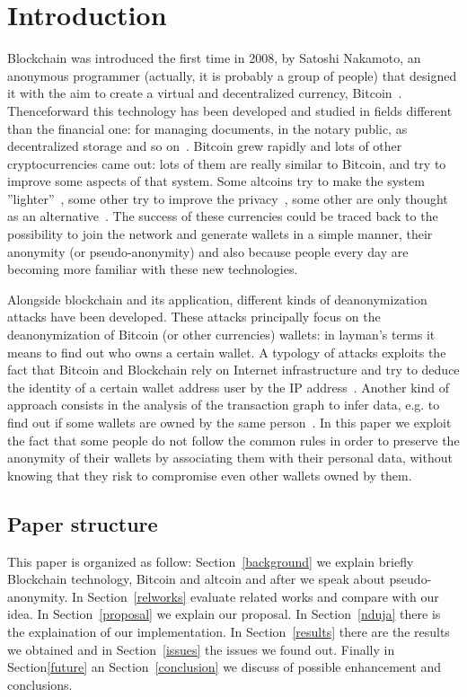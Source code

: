 \section{Introduction}
Blockchain was introduced the first time in 2008, by Satoshi Nakamoto, an
anonymous programmer (actually, it is probably a group of people) that
designed it with the aim to create a virtual and decentralized currency,
Bitcoin~\cite{bib:satoshi}.
Thenceforward this technology has been developed and
studied in fields different than the financial one: for managing documents, in
the notary public, as decentralized storage and so on~\cite{bib:air}.
Bitcoin grew
rapidly and lots of other cryptocurrencies came out: lots of them are really
similar to Bitcoin, and try to improve some aspects of that system. Some
altcoins try to make the system ''lighter''~\cite{bib:litecoin:wiki},
some other try to improve the privacy~\cite{bib:zerocoin:white_paper,
bib:zerocash:white_paper,
bib:monero:white_paper}, some other are only thought as an
alternative~\cite{bib:bitcoinbeyond}.
The success of these
currencies could be traced back to the possibility to join the network
and generate wallets in a simple manner,
their anonymity (or pseudo-anonymity) and also because people every day are
becoming more familiar with these new technologies.


Alongside blockchain and its application, different kinds of deanonymization
attacks have been developed.
These attacks principally focus on the
deanonymization of Bitcoin (or other currencies) wallets: in layman's terms
it means to find out who owns a certain wallet.
A typology of attacks exploits the fact that Bitcoin and Blockchain rely
on Internet infrastructure and try to deduce the identity of a certain wallet
address user by the IP address~\cite{bib:deanon}.
Another kind of approach consists in the analysis of the transaction graph
to infer data, e.g. to find out if some wallets are owned by the same
person~\cite{bib:fistful}.
In this paper we exploit the fact that some people do not follow the common
rules in order to preserve the anonymity of their wallets by associating them
with their personal data, without knowing that they risk to compromise even
other wallets owned by them.


\subsection{Paper structure}
This paper is organized as follow: Section~\ref{background} we explain briefly
Blockchain technology, Bitcoin and altcoin and after we speak about
pseudo-anonymity. In Section~\ref{relworks} evaluate related works and compare
with our idea. In Section~\ref{proposal} we explain our proposal. In
Section~\ref{nduja} there is the explaination of our implementation. In
Section~\ref{results} there are the results we obtained and in
Section~\ref{issues} the issues we found out. Finally in Section\ref{future} an
Section~\ref{conclusion} we discuss of possible enhancement and conclusions.

